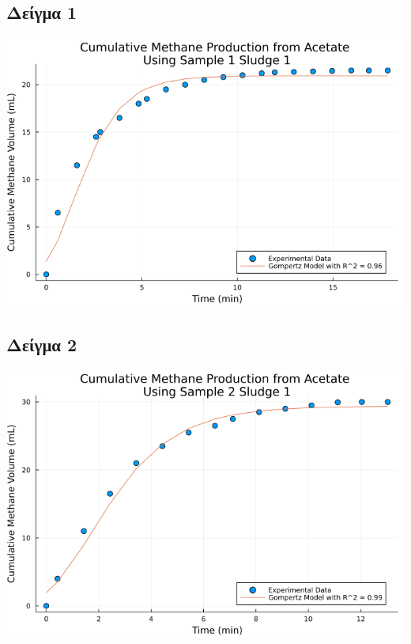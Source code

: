 \documentclass[11pt]{article}
\begin{document}
\subsection{Δείγμα 1}
\label{sec:orgd4112dc}
\begin{center}
\includegraphics[width=.9\linewidth]{../plots/BMPs/Acetate/methane_kinetics_acet_test_1_s1_min.png}
\end{center}

\subsection{Δείγμα 2}
\label{sec:orga8bf90f}
\begin{center}
\includegraphics[width=.9\linewidth]{../plots/BMPs/Acetate/methane_kinetics_acet_test_2_s1_min.png}
\end{center}
\end{document}
